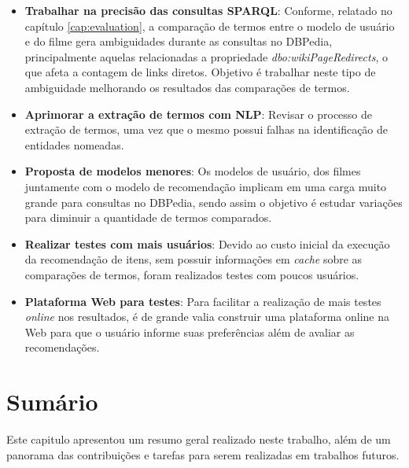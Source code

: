\begin{itemize}
	\item{\textbf{Trabalhar na precisão das consultas \ac{SPARQL}}: Conforme, relatado no capítulo \ref{cap:evaluation}, a comparação de termos entre o modelo de usuário e do filme gera ambiguidades durante as consultas no DBPedia, principalmente aquelas relacionadas a propriedade \textit{dbo:wikiPageRedirects},  o que afeta a contagem de links diretos. Objetivo é trabalhar neste tipo de ambiguidade melhorando os resultados das comparações de termos.}
	
	\item{\textbf{Aprimorar a extração de termos com \ac{NLP}}: Revisar o processo de extração de termos, uma vez que o mesmo possui falhas na identificação de entidades nomeadas.}
	
	\item{\textbf{Proposta de modelos menores}: Os modelos de usuário, dos filmes juntamente com o modelo de recomendação implicam em uma carga muito grande para consultas no DBPedia, sendo assim o objetivo é estudar variações para diminuir a quantidade de termos comparados.}
	
	\item{\textbf{Realizar testes com mais usuários}: Devido ao custo inicial da execução da recomendação de itens, sem possuir informações em \textit{cache} sobre as comparações de termos, foram realizados testes com poucos usuários.}

	\item{\textbf{Plataforma Web para testes}: Para facilitar a realização de mais testes \textit{online} nos resultados, é de grande valia construir uma plataforma online na Web para que o usuário informe suas preferências além de avaliar as recomendações.}
\end{itemize}

\section{Sumário}

Este capitulo apresentou um resumo geral realizado neste trabalho, além de um panorama das contribuições  e tarefas para serem realizadas em trabalhos futuros.